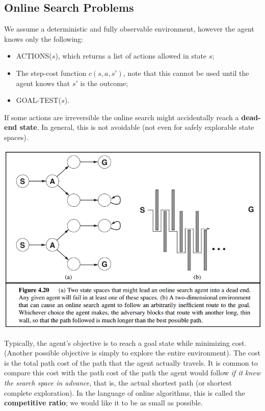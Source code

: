 \subsection{Online Search Problems}
We assume a deterministic and fully observable environment, however the agent knows only the following:
\begin{itemize}
    \item ACTIONS($s$), which returns a list of actions allowed in state $s$;

    \item The step-cost function $c(s, a, s')$, note that this cannot be used until the agent knows that $s'$ is the outcome;

    \item GOAL-TEST($s$).
\end{itemize}
If some actions are irreversible the online search might accidentally reach a \textbf{dead-end state}. In general, this is not avoidable (not even for safely explorable state spaces).
\begin{center}
    \includegraphics[scale=0.8]{images/dead-end.png}
\end{center}
Typically, the agent’s objective is to reach a goal state while minimizing cost. (Another possible objective is simply to explore the entire environment). The cost is the total path cost of the path that the agent actually travels. It is common to compare this cost with the path cost of the path the agent would follow \textit{if it knew the search space in advance}, that is, the actual shortest path (or shortest complete exploration).  In the language of online algorithms, this is called the \textbf{competitive ratio}; we would like it to be as small as possible.

